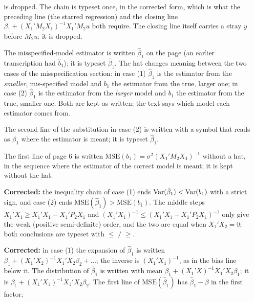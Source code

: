 \documentclass[11pt]{article}
\begin{document}
\begin{transcriptnotes}
        is dropped. The chain is typeset once, in the corrected form, which is what
        the preceding line (the starred regression) and the closing line
        $\beta_{1} + (X_{1}'M_{2}X_{1})^{-1}X_{1}'M_{2}u$ both require. The closing
        line itself carries a stray $y$ before $M_{2}u$; it is dropped.
  \item The misspecified-model estimator is written $\hat{\beta}_{1}$ on the page
        (an earlier transcription had $\hat{b}_{1}$); it is typeset $\hat{\beta}_{1}$.
        The hat changes meaning between the two cases of the misspecification
        section: in case (1) $\hat{\beta}_{1}$ is the estimator from the \emph{smaller},
        mis-specified model and $b_{1}$ the estimator from the true, larger one; in
        case (2) $\hat{\beta}_{1}$ is the estimator from the \emph{larger} model and
        $b_{1}$ the estimator from the true, smaller one. Both are kept as written;
        the text says which model each estimator comes from.
  \item The second line of the substitution in case (2) is written with a symbol
        that reads as $\beta_{1}$ where the estimator is meant; it is typeset
        $\hat{\beta}_{1}$.
  \item The first line of page 6 is written $\text{MSE}(b_{1}) = \sigma^{2}(X_{1}'M_{2}X_{1})^{-1}$
        without a hat, in the sequence where the estimator of the correct model is
        meant; it is kept without the hat.
  \item \textbf{Corrected:} the inequality chain of case (1) ends
        $\operatorname{Var}(\hat{\beta}_{1}) < \operatorname{Var}(b_{1})$ with a strict sign, and case (2) ends
        $\text{MSE}(\hat{\beta}_{1}) > \text{MSE}(b_{1})$. The middle steps
        $X_{1}'X_{1} \ge X_{1}'X_{1} - X_{1}'P_{2}X_{1}$ and
        $(X_{1}'X_{1})^{-1} \le (X_{1}'X_{1} - X_{1}'P_{2}X_{1})^{-1}$ only give the
        weak (positive semi-definite) order, and the two are equal when
        $X_{1}'X_{2} = 0$; both conclusions are typeset with $\le$ / $\ge$.
  \item \textbf{Corrected:} in case (1) the expansion of $\hat{\beta}_{1}$ is written
        $\beta_{1} + (X_{1}'X_{2})^{-1}X_{1}'X_{2}\beta_{2} + \dots$; the inverse is
        $(X_{1}'X_{1})^{-1}$, as in the bias line below it. The distribution of
        $\hat{\beta}_{1}$ is written with mean
        $\beta_{1} + (X_{1}'X)^{-1}X_{1}'X_{2}\beta_{1}$; it is
        $\beta_{1} + (X_{1}'X_{1})^{-1}X_{1}'X_{2}\beta_{2}$. The first line of
        $\text{MSE}(\hat{\beta}_{1})$ has $\hat{\beta}_{1} - \beta$ in the first factor;

\end{transcriptnotes}
\end{document}
